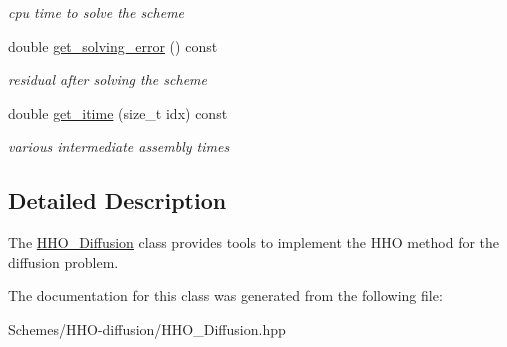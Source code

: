 \begin{DoxyCompactItemize}
\begin{DoxyCompactList}\small\item\em cpu time to solve the scheme \end{DoxyCompactList}\item 
double \hyperlink{group__HHO__Diffusion_gad53ffa4a52af7bf6803e28f36c7e3365}{get\+\_\+solving\+\_\+error} () const
\begin{DoxyCompactList}\small\item\em residual after solving the scheme \end{DoxyCompactList}\item 
double \hyperlink{group__HHO__Diffusion_ga43051dfce03a9f75c33903f1736f4e1a}{get\+\_\+itime} (size\+\_\+t idx) const
\begin{DoxyCompactList}\small\item\em various intermediate assembly times \end{DoxyCompactList}\end{DoxyCompactItemize}


\subsection{Detailed Description}
The \hyperlink{classHArDCore2D_1_1HHO__Diffusion}{H\+H\+O\+\_\+\+Diffusion} class provides tools to implement the H\+HO method for the diffusion problem. 

The documentation for this class was generated from the following file\+:\begin{DoxyCompactItemize}
\item 
Schemes/\+H\+H\+O-\/diffusion/H\+H\+O\+\_\+\+Diffusion.\+hpp\end{DoxyCompactItemize}
